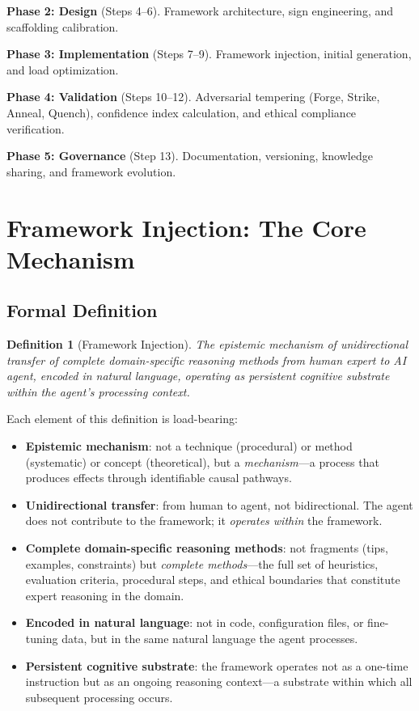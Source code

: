 \documentclass[12pt,a4paper]{article}
\newtheorem{definition}{Definition}[section]
\begin{document}
\textbf{Phase 2: Design} (Steps 4--6). Framework architecture, sign engineering, and scaffolding calibration.

\textbf{Phase 3: Implementation} (Steps 7--9). Framework injection, initial generation, and load optimization.

\textbf{Phase 4: Validation} (Steps 10--12). Adversarial tempering (Forge, Strike, Anneal, Quench), confidence index calculation, and ethical compliance verification.

\textbf{Phase 5: Governance} (Step 13). Documentation, versioning, knowledge sharing, and framework evolution.


\section{Framework Injection: The Core Mechanism}
\label{sec:fi}

\subsection{Formal Definition}

\begin{definition}[Framework Injection]
\label{def:fi}
The epistemic mechanism of unidirectional transfer of complete domain-specific reasoning methods from human expert to AI agent, encoded in natural language, operating as persistent cognitive substrate within the agent's processing context.
\end{definition}

Each element of this definition is load-bearing:

\begin{itemize}
  \item \textbf{Epistemic mechanism}: not a technique (procedural) or method (systematic) or concept (theoretical), but a \emph{mechanism}---a process that produces effects through identifiable causal pathways.
  \item \textbf{Unidirectional transfer}: from human to agent, not bidirectional. The agent does not contribute to the framework; it \emph{operates within} the framework.
  \item \textbf{Complete domain-specific reasoning methods}: not fragments (tips, examples, constraints) but \emph{complete methods}---the full set of heuristics, evaluation criteria, procedural steps, and ethical boundaries that constitute expert reasoning in the domain.
  \item \textbf{Encoded in natural language}: not in code, configuration files, or fine-tuning data, but in the same natural language the agent processes.
  \item \textbf{Persistent cognitive substrate}: the framework operates not as a one-time instruction but as an ongoing reasoning context---a substrate within which all subsequent processing occurs.
\end{itemize}
\end{document}
